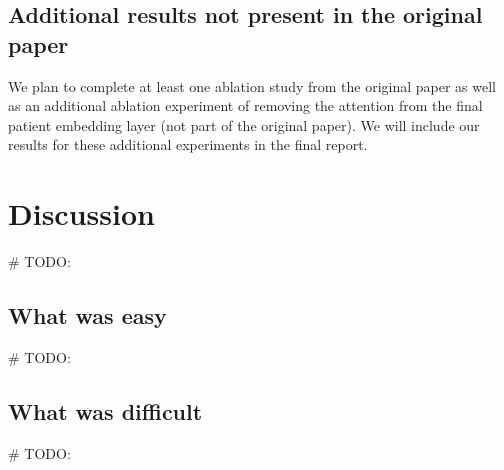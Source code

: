 \documentclass[11pt,a4paper,fleqn]{article}
\begin{document}
\subsection{Additional results not present in the original paper}
We plan to complete at least one ablation study from the original paper as well
as an additional ablation experiment of removing the attention from the final patient
embedding layer (not part of the original paper). We will include our results
for these additional experiments in the final report.

\section{Discussion}
\# TODO:


\subsection{What was easy}
\# TODO:


\subsection{What was difficult}
\# TODO:
\end{document}
